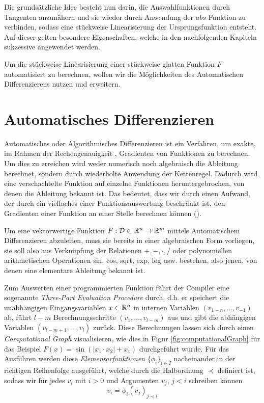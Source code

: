 Die grundsätzliche Idee besteht nun darin, die Auswahlfunktionen durch Tangenten anzunähern und sie wieder durch Anwendung der $abs$ Funktion zu verbinden, sodass eine stückweise Linearisierung der Ursprungsfunktion entsteht. Auf dieser gelten besondere Eigenschaften, welche in den nachfolgenden Kapiteln sukzessive angewendet werden.

Um die stückweise Linearisierung einer stückweise glatten Funktion $F$ automatisiert zu berechnen, wollen wir die Möglichkeiten des Automatischen Differenzierens nutzen und erweitern.

\section{Automatisches Differenzieren}
Automatisches oder Algorithmisches Differenzieren ist ein Verfahren, um exakte, im Rahmen der Rechengenauigkeit \cite[S.51]{griewank2008evaluating}, Gradienten von Funktionen zu berechnen. Um dies zu erreichen wird weder numerisch noch algebraisch die Ableitung berechnet, sondern durch wiederholte Anwendung der Kettenregel. Dadurch wird eine verschachtelte Funktion auf einzelne Funktionen heruntergebrochen, von denen die Ableitung bekannt ist. Das bedeutet, dass wir durch einen Aufwand, der durch ein vielfaches einer Funktionsauswertung beschränkt ist, den Gradienten einer Funktion an einer Stelle berechnen können (\cite[S. 43, S.83]{griewank2008evaluating}). 

Um eine vektorwertige Funktion $F:\mathcal D \subset \mathbb{R}^n\to \mathbb{R}^m$ mittels Automatischem Differenzieren abzuleiten, muss sie bereits in einer algebraischen Form vorliegen, sie soll also aus Verknüpfung der Relationen $+, -, \cdot, /$ oder polynomiellen arithmetischen Operationen sin, cos, sqrt, exp, log usw. bestehen, also jenen, von denen eine elementare Ableitung bekannt ist.  

Zum Auswerten einer programmierten Funktion führt der Compiler eine sogenannte \textit{Three-Part Evaluation Procedure} durch, d.h. er speichert die unabhängigen Eingangsvariablen $x\in \mathbb{R}^n$ in internen Variablen $(v_{1-n},\ldots,v_{-1})$ ab, führt $l-m$ Berechnungsschritte $(v_1,\ldots, v_{l-m})$ aus und gibt die abhängigen Variablen $(v_{l-m+1},\ldots,v_l)$ zurück. Diese Berechnungen lassen sich durch einen \textit{Computational Graph} visualisieren, wie dies in Figur \ref{fig:computationalGraph} für das Beispiel $F(x) = \sin(|x_1\cdot x_2|+x_1)$ durchgeführt wurde. 
Für das Ausführen werden diese \textit{Elementarfunktionen} $\lbrace \phi_i \rbrace_{i\in I}$ nacheinander in der richtigen Reihenfolge ausgeführt, welche durch die Halbordnung $\prec$ definiert ist, sodass wir für jedes $v_i$ mit $i>0$ und Argumenten $v_j$, $j<i$ schreiben können
\[
 v_i = \phi_i(v_j)_{j\prec i}
\]

